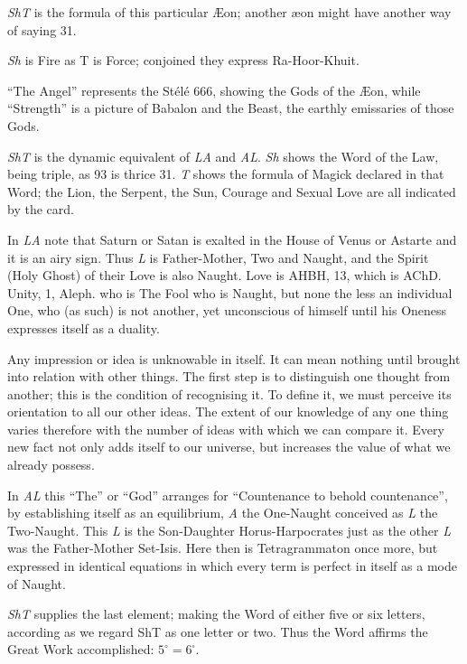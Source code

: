 \textit{ShT} is the formula of this particular \AE{}on; another \ae{}on might have another way of saying 31.

\textit{Sh} is Fire as T is Force; conjoined they express Ra-Hoor-Khuit.

\enquote{The Angel} represents the St\'{e}l\'{e} 666, showing the Gods of the \AE{}on, while \enquote{Strength} is a picture of Babalon and the Beast, the earthly emissaries of those Gods.

\textit{ShT} is the dynamic equivalent of \textit{LA} and \textit{AL}. \textit{Sh} shows the Word of the Law, being triple, as 93 is thrice 31. \textit{T} shows the formula of Magick declared in that Word; the Lion, the Serpent, the Sun, Courage and Sexual Love are all indicated by the card.

In \textit{LA} note that Saturn or Satan is exalted in the House of Venus or Astarte and it is an airy sign. Thus \textit{L} is Father-Mother, Two and Naught, and the Spirit (Holy Ghost) of their Love is also Naught. Love is AHBH, 13, which is AChD. Unity, 1, Aleph. who is The Fool who is Naught, but none the less an individual One, who (as such) is not another, yet unconscious of himself until his Oneness expresses itself as a duality.

Any impression or idea is unknowable in itself. It can mean nothing until brought into relation with other things. The first step is to distinguish one thought from another; this is the condition of recognising it. To define it, we must perceive its orientation to all our other ideas. The extent of our knowledge of any one thing varies therefore with the number of ideas with which we can compare it. Every new fact not only adds itself to our universe, but increases the value of what we already possess.

In \textit{AL} this \enquote{The} or \enquote{God} arranges for \enquote{Countenance to behold countenance}, by establishing itself as an equilibrium, \textit{A} the One-Naught conceived as \textit{L} the Two-Naught. This \textit{L} is the Son-Daughter Horus-Harpocrates just as the other \textit{L} was the Father-Mother Set-Isis. Here then is Tetragrammaton once more, but expressed in identical equations in which every term is perfect in itself as a mode of Naught.

\textit{ShT} supplies the last element; making the Word of either five or six letters, according as we regard ShT as one letter or two. Thus the Word affirms the Great Work accomplished: $5^{\circ}=6^{\square}$.

